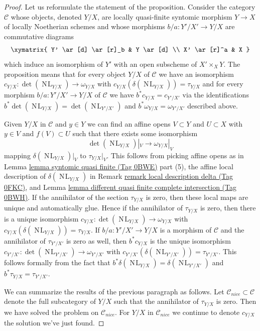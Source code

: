 \documentclass{amsart}
\theoremstyle{plain}
\theoremstyle{definition}
\theoremstyle{remark}
\numberwithin{equation}{subsection}
\def\NL{\mathop{N\!L}\nolimits}
\begin{document}
\begin{proof}
Let us reformulate the statement of the proposition. Consider the category
$\mathcal{C}$ whose objects, denoted $Y/X$, are locally quasi-finite syntomic
morphism $Y \to X$ of locally Noetherian schemes and whose morphisms
$b/a : Y'/X' \to Y/X$ are commutative diagrams
$$
\xymatrix{
Y' \ar[d] \ar[r]_b & Y \ar[d] \\
X' \ar[r]^a & X
}
$$
which induce an isomorphism of $Y'$ with an open subscheme of
$X' \times_X Y$. The proposition means that for every object
$Y/X$ of $\mathcal{C}$ we have an isomorphism
$c_{Y/X} : \det(\NL_{Y/X}) \to \omega_{Y/X}$
with $c_{Y/X}(\delta(\NL_{Y/X})) = \tau_{Y/X}$
and for every morphism $b/a : Y'/X' \to Y/X$ of $\mathcal{C}$ we have
$b^*c_{Y/X} = c_{Y'/X'}$ via the identifications
$b^*\det(\NL_{Y/X}) = \det(\NL_{Y'/X'})$ and
$b^*\omega_{Y/X} = \omega_{Y'/X'}$ described above.

\medskip\noindent
Given $Y/X$ in $\mathcal{C}$ and $y \in Y$ we can find
an affine opens $V \subset Y$ and $U \subset X$ with
$y \in V$ and $f(V) \subset U$
such that there exists some isomorphism
$$
\det(\NL_{Y/X})|_V \longrightarrow \omega_{Y/X}|_V
$$
mapping $\delta(\NL_{Y/X})|_V$ to $\tau_{Y/X}|_V$. This follows
from picking affine opens as in
Lemma \href{https://stacks.math.columbia.edu/tag/0BWE}{lemma syntomic quasi finite (Tag 0BWE)} part (5), the affine
local description of $\delta(\NL_{Y/X})$ in
Remark \href{https://stacks.math.columbia.edu/tag/0FKC}{remark local description delta (Tag 0FKC)}, and
Lemma \href{https://stacks.math.columbia.edu/tag/0BWH}{lemma different quasi finite complete intersection (Tag 0BWH)}.
If the annihilator of the section $\tau_{Y/X}$ is zero, then
these local maps are unique and automatically glue. Hence if the annihilator
of $\tau_{Y/X}$ is zero, then there is a unique isomorphism
$c_{Y/X} : \det(\NL_{Y/X}) \to \omega_{Y/X}$ with
$c_{Y/X}(\delta(\NL_{Y/X})) = \tau_{Y/X}$.
If $b/a : Y'/X' \to Y/X$ is a morphism of $\mathcal{C}$
and the annihilator of $\tau_{Y'/X'}$ is zero as well,
then $b^*c_{Y/X}$ is the unique isomorphism
$c_{Y'/X'} : \det(\NL_{Y'/X'}) \to \omega_{Y'/X'}$ with
$c_{Y'/X'}(\delta(\NL_{Y'/X'})) = \tau_{Y'/X'}$.
This follows formally from the fact that
$b^*\delta(\NL_{Y/X}) = \delta(\NL_{Y'/X'})$ and
$b^*\tau_{Y/X} = \tau_{Y'/X'}$.

\medskip\noindent
We can summarize the results of the previous paragraph as follows.
Let $\mathcal{C}_{nice} \subset \mathcal{C}$ denote the
full subcategory of $Y/X$ such that the annihilator of
$\tau_{Y/X}$ is zero. Then we have solved the problem
on $\mathcal{C}_{nice}$. For $Y/X$ in $\mathcal{C}_{nice}$
we continue to denote $c_{Y/X}$ the solution we've just found.


\end{proof}
\end{document}
